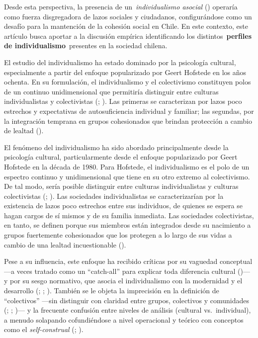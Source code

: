 \documentclass[
  letterpaper,
  DIV=11,
  numbers=noendperiod]{scrartcl}
\begin{document}
Desde esta perspectiva, la presencia de un~\emph{individualismo asocial}
() operaría como fuerza disgregadora
de lazos sociales y ciudadanos, configurándose como un desafío para la
mantención de la cohesión social en Chile. En este contexto, este
artículo busca aportar a la discusión empírica identificando los
distintos~\textbf{perfiles de individualismo}~presentes en la sociedad
chilena.

El estudio del individualismo ha estado dominado por la psicología
cultural, especialmente a partir del enfoque popularizado por Geert
Hofstede en los años ochenta. En su formulación, el individualismo y el
colectivismo constituyen polos de un continuo unidimensional que
permitiría distinguir entre culturas individualistas y colectivistas
(;
). Las primeras se caracterizan por
lazos poco estrechos y expectativas de autosuficiencia individual y
familiar; las segundas, por la integración temprana en grupos
cohesionados que brindan protección a cambio de lealtad
().

El fenómeno del individualismo ha sido abordado principalmente desde la
psicología cultural, particularmente desde el enfoque popularizado por
Geert Hofstede en la década de 1980. Para Hofstede, el individualismo es
el polo de un espectro continuo y unidimensional que tiene en su otro
extremo al colectivismo. De tal modo, sería posible distinguir entre
culturas individualistas y culturas colectivistas
(;
). Las sociedades individualistas se
caracterizarían por la existencia de lazos poco estrechos entre sus
individuos, de quienes se espera se hagan cargos de sí mismos y de su
familia inmediata. Las sociedades colectivistas, en tanto, se definen
porque sus miembros están integrados desde su nacimiento a grupos
fuertemente cohesionados que los protegen a lo largo de sus vidas a
cambio de una lealtad incuestionable ().

Pese a su influencia, este enfoque ha recibido críticas por su vaguedad
conceptual ---a veces tratado como un ``catch-all'' para explicar toda
diferencia cultural ()--- y por su sesgo normativo, que asocia el individualismo con la
modernidad y el desarrollo (; ;
). También se le objeta la
imprecisión en la definición de ``colectivos'' ---sin distinguir con
claridad entre grupos, colectivos y comunidades
(;
;
)--- y la
frecuente confusión entre niveles de análisis (cultural vs.~individual),
a menudo solapando cofundiéndose a nivel operacional y teórico con
conceptos como el \emph{self-construal} (; ).
\end{document}
